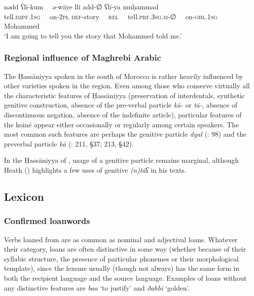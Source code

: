 \documentclass[output=paper]{langsci/langscibook}
\begin{document}
\ea
\gll n{\R}ədd ʕlī-kum~~ ə{\R}-{\R}wāye lli {\R}add-∅ ʕlī-ya muḥammad\\
 tell.\textsc{impf.}1\textsc{sg}~~ on-2\textsc{pl} \textsc{def-}story~~ \textsc{rel}~~ tell.\textsc{prf.3sg.m-}∅~~ on-\textsc{obl.1sg} Mohammed\\
\glt ‘I am going to tell you the story that Mohammed told me.’ 
\z

\subsubsection{Regional influence of Maghrebi Arabic} %

The Ḥassāniyya spoken in the south of Morocco is rather heavily influenced by other  varieties spoken in the region. Even among those who conserve virtually all the characteristic features of Ḥassāniyya (preservation of interdentals, synthetic genitive construction, absence of the pre-verbal particle \textit{kā-} or \textit{tā-}, absence of discontinuous {negation}, absence of the {indefinite article}), particular features of the   koiné appear either occasionally or regularly among certain speakers. The most common such features are perhaps the genitive particle \textit{dyal} (\citealt{Taine-Cheikh1997socio}: 98) and the preverbal particle \textit{kā} (\citealt{Aguadé1998}: 211, §37; 213, §42).

In the Ḥassāniyya of , usage of a genitive particle remains marginal, although Heath (\citeyear[162]{Heath2004}) highlights a few uses of genitive \textit{(n)tāʕ} in his texts.

\subsection{Lexicon} %

\subsubsection{Confirmed loanwords} %


Verbs loaned from   are as common as nominal and adjectival loans. Whatever their category, loans are often distinctive in some way (whether because of their {syllabic structure}, the presence of particular phonemes or their morphological template), since the lexeme usually (though not always) has the same form in both the {recipient language} and the {source language}. Examples of loans without any distinctive features are \textit{ba{\R}{\R}a{\R}} ‘to justify’ and \textit{ðahbi} ‘golden’. 
\end{document}
